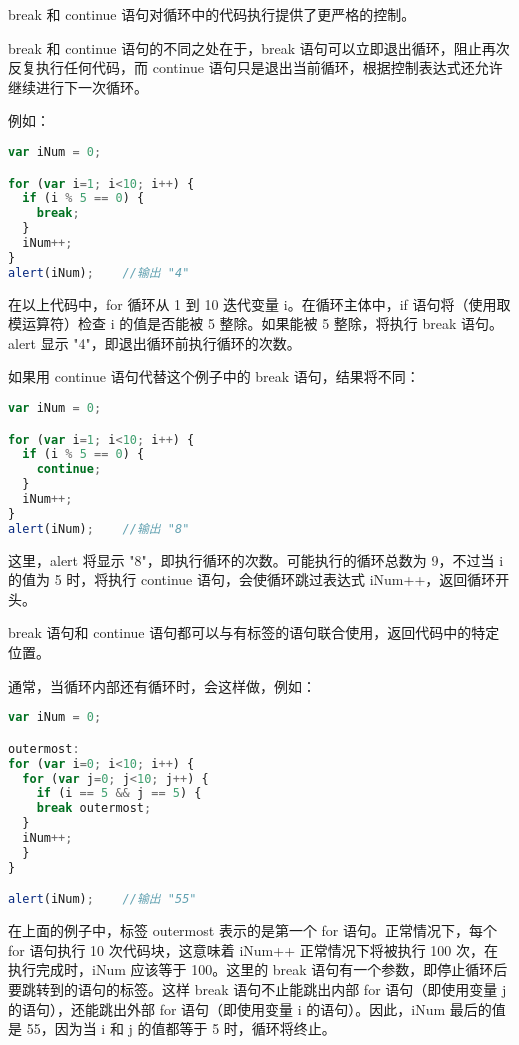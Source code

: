 break 和 continue 语句对循环中的代码执行提供了更严格的控制。

break 和 continue 语句的不同之处在于，break 语句可以立即退出循环，阻止再次反复执行任何代码，而 continue 语句只是退出当前循环，根据控制表达式还允许继续进行下一次循环。


例如：

\begin{lstlisting}[language=JavaScript]
var iNum = 0;

for (var i=1; i<10; i++) {
  if (i % 5 == 0) {
    break;
  }
  iNum++;
}
alert(iNum);	//输出 "4"
\end{lstlisting}

在以上代码中，for 循环从 1 到 10 迭代变量 i。在循环主体中，if 语句将（使用取模运算符）检查 i 的值是否能被 5 整除。如果能被 5 整除，将执行 break 语句。alert 显示 "4"，即退出循环前执行循环的次数。

如果用 continue 语句代替这个例子中的 break 语句，结果将不同：



\begin{lstlisting}[language=JavaScript]
var iNum = 0;

for (var i=1; i<10; i++) {
  if (i % 5 == 0) {
    continue;
  }
  iNum++;
}
alert(iNum);	//输出 "8"
\end{lstlisting}


这里，alert 将显示 "8"，即执行循环的次数。可能执行的循环总数为 9，不过当 i 的值为 5 时，将执行 continue 语句，会使循环跳过表达式 iNum++，返回循环开头。

break 语句和 continue 语句都可以与有标签的语句联合使用，返回代码中的特定位置。

通常，当循环内部还有循环时，会这样做，例如：

\begin{lstlisting}[language=JavaScript]
var iNum = 0;

outermost:
for (var i=0; i<10; i++) {
  for (var j=0; j<10; j++) {
    if (i == 5 && j == 5) {
    break outermost;
  }
  iNum++;
  }
}

alert(iNum);	//输出 "55"
\end{lstlisting}


在上面的例子中，标签 outermost 表示的是第一个 for 语句。正常情况下，每个 for 语句执行 10 次代码块，这意味着 iNum++ 正常情况下将被执行 100 次，在执行完成时，iNum 应该等于 100。这里的 break 语句有一个参数，即停止循环后要跳转到的语句的标签。这样 break 语句不止能跳出内部 for 语句（即使用变量 j 的语句），还能跳出外部 for 语句（即使用变量 i 的语句）。因此，iNum 最后的值是 55，因为当 i 和 j 的值都等于 5 时，循环将终止。

